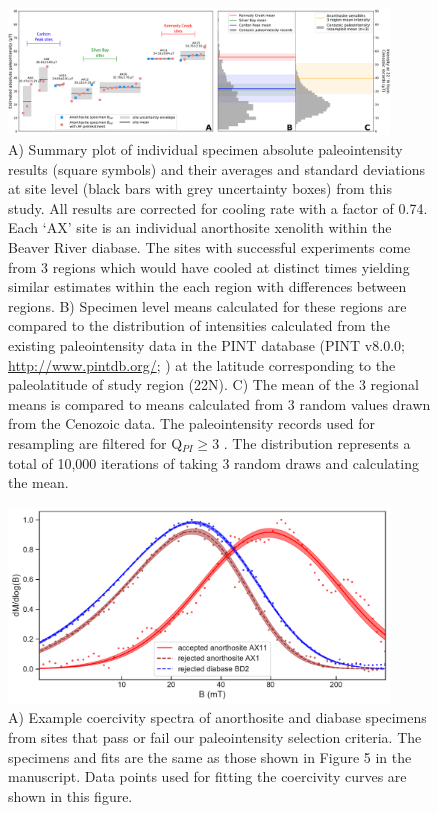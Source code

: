 \documentclass[9pt,twoside,lineno]{pnas-new}
\begin{document}
\begin{figure}[h!]
\noindent\includegraphics[width=0.9\textwidth]{Cenozoic_resample_SI.pdf}
\centering
\caption{\footnotesize{A) Summary plot of individual specimen absolute paleointensity results (square symbols) and their averages and standard deviations at site level (black bars with grey uncertainty boxes) from this study. All results are corrected for cooling rate with a factor of 0.74. Each `AX' site is an individual anorthosite xenolith within the Beaver River diabase. The sites with successful experiments come from 3 regions which would have cooled at distinct times yielding similar estimates within the each region with differences between regions. B) Specimen level means calculated for these regions are compared to the distribution of intensities calculated from the existing paleointensity data in the PINT database (PINT v8.0.0; \url{http://www.pintdb.org/}; \citealp{Bono2021a}) at the latitude corresponding to the paleolatitude of study region (22\textdegree N). C) The mean of the 3 regional means is compared to means calculated from 3 random values drawn from the Cenozoic data. The paleointensity records used for resampling are filtered for Q$_{PI} \geq$3 \cite{Biggin2014a}. The distribution represents a total of 10,000 iterations of taking 3 random draws and calculating the mean.}}
\label{fig:Cenozoic_PINT}
\end{figure}

\clearpage

\begin{figure}[h!]
\noindent\includegraphics[width=0.9\textwidth]{example_unmix_plot_with_data.pdf}
\centering
\caption{\footnotesize{A) Example coercivity spectra of anorthosite and diabase specimens from sites that pass or fail our paleointensity selection criteria. The specimens and fits are the same as those shown in Figure 5 in the manuscript. Data points used for fitting the coercivity curves are shown in this figure. }}
\label{fig:Cenozoic_PINT}
\end{figure}
\end{document}
